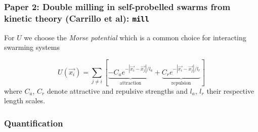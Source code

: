 \documentclass[compress]{beamer}
\begin{document}
\begin{frame}
	\frametitle{Paper 2: Double milling in self-probelled swarms from kinetic theory (Carrillo et al): \texttt{mill}}
	

For \( U \) we choose the \textit{Morse potential} which is a common choice for interacting swarming systems

\begin{equation} \label{morsePotential}
U(\vec{x_{i}}) = \sum_{j \neq i}^{} [ \underbrace{-C_{a} e^{-| \vec{x_{i}} - \vec{x_{j}} | / l_{a}}}_{\text{attraction}} + \underbrace{C_{r}e^{-|\vec{x_{i}}-\vec{x_{j}}|/l_{r}}}_{\text{repulsion}} ]
\end{equation}
where \( C_{a}\), \( C_{r}\) denote attractive and repulsive strengths and \( l_{a}\), \( l_{r}\) their respective length scales.
	
\end{frame}

\begin{frame}
  \frametitle{Quantification}
%
%
\end{frame}
\end{document}

